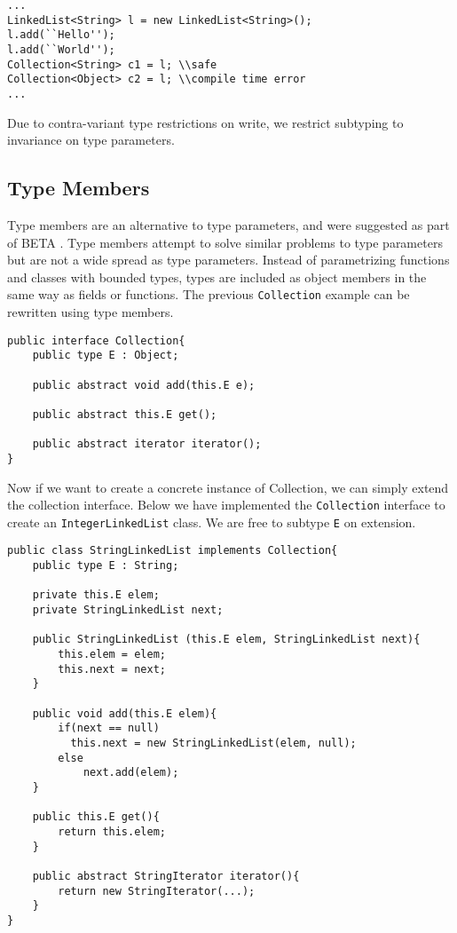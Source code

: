 \documentclass[11pt
              , a4paper
              , twoside
              , openright
              ]{report}
\numberwithin{case}{theorem}
\numberwithin{subcase}{case}
\begin{document}
\begin{lstlisting}[mathescape, style=custom_lang]
...
LinkedList<String> l = new LinkedList<String>();
l.add(``Hello'');
l.add(``World'');
Collection<String> c1 = l; \\safe
Collection<Object> c2 = l; \\compile time error
...
\end{lstlisting}
Due to contra-variant type restrictions on write, we restrict subtyping to invariance on type parameters.

\subsection{Type Members}
Type members are an alternative to type parameters, and were suggested as part of BETA \cite{Madsen:1989:VCP:74877.74919}. Type members attempt to solve similar problems to type parameters but are not a wide spread as type parameters. Instead of parametrizing functions and classes with bounded types, types are included as object members in the same way as fields or functions. The previous \verb|Collection| example can be rewritten using type members.
\begin{lstlisting}[mathescape, style=custom_lang]
public interface Collection{
	public type E : Object;

	public abstract void add(this.E e);
	
	public abstract this.E get();
	
	public abstract iterator iterator();
}
\end{lstlisting}
Now if we want to create a concrete instance of Collection, we can simply extend the collection interface. Below we have implemented the \verb|Collection| interface to create an \verb|IntegerLinkedList| class. We are free to subtype \verb|E| on extension.
\begin{lstlisting}[mathescape, style=custom_lang]
public class StringLinkedList implements Collection{
	public type E : String;

	private this.E elem;
	private StringLinkedList next;
	
	public StringLinkedList (this.E elem, StringLinkedList next){
		this.elem = elem;
		this.next = next;
	}
	
	public void add(this.E elem){
		if(next == null)
		  this.next = new StringLinkedList(elem, null);
		else
			next.add(elem);
	}
	
	public this.E get(){
		return this.elem;
	}
	
	public abstract StringIterator iterator(){
		return new StringIterator(...);
	}
}
\end{lstlisting}
\end{document}
